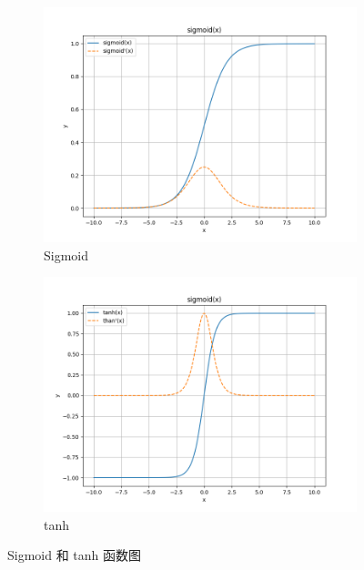 \documentclass[lang=cn,a4paper,newtx]{elegantpaper}
\begin{document}
\begin{figure}[htbp]
    \centering
    \begin{subfigure}{0.49\textwidth}
        \centering
        \includegraphics[width=\textwidth]{images/sigmoid.png}
        \caption{Sigmoid}
        \label{fig:sigmoid}
    \end{subfigure}
    \hfill
    \begin{subfigure}{0.49\textwidth}
        \centering
        \includegraphics[width=\textwidth]{images/tanh.png}
        \caption{tanh}
        \label{fig:tanh}
    \end{subfigure}
    \caption{Sigmoid 和 tanh 函数图}
    \label{fig:Sigmoid}
\end{figure}
\end{document}

